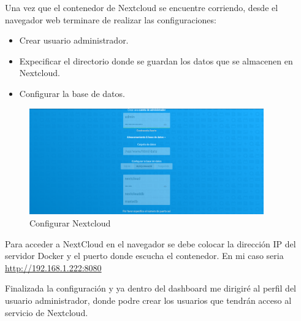 			Una vez que el contenedor de Nextcloud se encuentre corriendo, desde el navegador web terminare de realizar las configuraciones:

			
			\begin{itemize}
				
				\item Crear usuario administrador.
				\item Expecificar el directorio donde se guardan los datos que se almacenen en Nextcloud.
				\item Configurar la base de datos.
				
			\end{itemize}
			
			\begin{figure}[h]
				
				\centering
				
				\includegraphics[width=0.9\textwidth]{imagenes/docker/nextcloud/configurarNextcloud.png}
				
				\caption{Configurar Nextcloud}
				
				\label{fig:nextcloud}
				
			\end{figure}
			
			\pagebreak
			
			\begin{tcolorbox}[enhanced,frame style image=blueshade.png,opacityback=0.75,opacitybacktitle=0.25, colback=blue!5!white,colframe=blue!75!black,title=Nextcloud]
				Para acceder a NextCloud en el navegador se debe colocar la dirección IP del servidor Docker y el puerto donde escucha el contenedor. En mi caso seria \href{http://192.168.1.222:8080/}{\color{blue}http://192.168.1.222:8080}
			\end{tcolorbox}
			
			Finalizada la configuración y ya dentro del dashboard me dirigiré al perfil del usuario administrador, donde podre crear los usuarios que tendrán acceso al servicio de Nextcloud.
			
